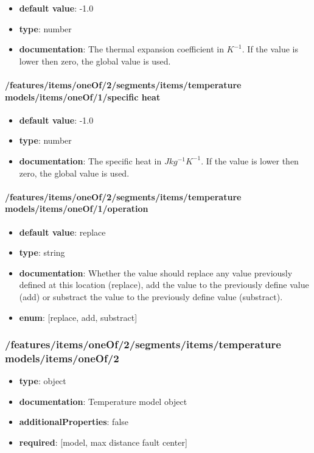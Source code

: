 \begin{itemize}\item {\bf default value}: -1.0
\item {\bf type}: number
\item {\bf documentation}: The thermal expansion coefficient in $K^{-1}$. If the value is lower then zero, the global value is used.
\end{itemize}\paragraph{/features/items/oneOf/2/segments/items/temperature models/items/oneOf/1/specific heat}
\begin{itemize}\item {\bf default value}: -1.0
\item {\bf type}: number
\item {\bf documentation}: The specific heat in $J kg^{-1} K^{-1}$. If the value is lower then zero, the global value is used.
\end{itemize}\paragraph{/features/items/oneOf/2/segments/items/temperature models/items/oneOf/1/operation}
\begin{itemize}\item {\bf default value}: replace
\item {\bf type}: string
\item {\bf documentation}: Whether the value should replace any value previously defined at this location (replace), add the value to the previously define value (add) or substract the value to the previously define value (substract).
\item {\bf enum}: [replace, add, substract]\end{itemize}\subsubsection{/features/items/oneOf/2/segments/items/temperature models/items/oneOf/2}
\begin{itemize}\item {\bf type}: object
\item {\bf documentation}: Temperature model object
\item {\bf additionalProperties}: false
\item {\bf required}: [model, max distance fault center]\end{itemize}
